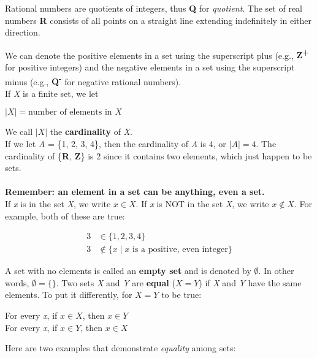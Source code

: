 Rational numbers are quotients of integers, thus \textbf{Q} for \textit{quotient}.  The set of real numbers \textbf{R} consists of all points on a straight line extending indefinitely in either direction.

We can denote the positive elements in a set using the superscript plus (e.g., \textbf{Z\textsuperscript{+}} for positive integers) and the negative elements in a set using the superscript minus (e.g., \textbf{Q\textsuperscript{-}} for negative rational numbers).\\

If \textit{X} is a finite set, we let
\begin{center}
$|X| = \text{number of elements in } X$
\end{center}

We call $|X|$ the \textbf{cardinality} of \textit{X}.\\

If we let \textit{A} = \{1, 2, 3, 4\}, then the cardinality of \textit{A} is 4, or $|A| = 4$.  The cardinality of \{\textbf{R}, \textbf{Z}\} is 2 since it contains two elements, which just happen to be sets.\\\\\textbf{Remember: an element in a set can be anything, even a set.}\\

If \textit{x} is in the set \textit{X}, we write $x \in X$.  If \textit{x} is NOT in the set \textit{X}, we write $x \not\in X$.  For example, both of these are true:

\begin{align*}
    3 &\in \{1, 2, 3, 4\}\\
    3 &\not\in \{x \mid x \text{ is a positive, even integer}\}
\end{align*}

A set with no elements is called an \textbf{empty set} and is denoted by $\emptyset$.  In other words, $\emptyset = \{\}.$
\clearpage
Two sets \textit{X} and \textit{Y} are \textbf{equal} ($X = Y$) if \textit{X} and \textit{Y} have the same elements.  To put it differently, for $X = Y$ to be true:

\begin{center}
For every \textit{x}, if $x \in X$, then $x \in Y$\\
For every \textit{x}, if $x \in Y$, then $x \in X$
\end{center}

Here are two examples that demonstrate \textit{equality} among sets:\\

